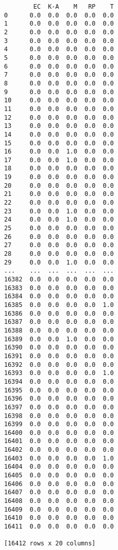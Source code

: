 \documentclass[11pt]{article}
\begin{document}
\begin{verbatim}
        EC  K-A    M   RP    T  
0      0.0  0.0  0.0  0.0  0.0  
1      0.0  0.0  0.0  0.0  0.0  
2      0.0  0.0  0.0  0.0  0.0  
3      0.0  0.0  0.0  0.0  0.0  
4      0.0  0.0  0.0  0.0  0.0  
5      0.0  0.0  0.0  0.0  0.0  
6      0.0  0.0  0.0  0.0  0.0  
7      0.0  0.0  0.0  0.0  0.0  
8      0.0  0.0  0.0  0.0  0.0  
9      0.0  0.0  0.0  0.0  0.0  
10     0.0  0.0  0.0  0.0  0.0  
11     0.0  0.0  0.0  0.0  0.0  
12     0.0  0.0  0.0  0.0  0.0  
13     0.0  0.0  0.0  0.0  0.0  
14     0.0  0.0  0.0  0.0  0.0  
15     0.0  0.0  0.0  0.0  0.0  
16     0.0  0.0  1.0  0.0  0.0  
17     0.0  0.0  1.0  0.0  0.0  
18     0.0  0.0  0.0  0.0  0.0  
19     0.0  0.0  0.0  0.0  0.0  
20     0.0  0.0  0.0  0.0  0.0  
21     0.0  0.0  0.0  0.0  0.0  
22     0.0  0.0  0.0  0.0  0.0  
23     0.0  0.0  1.0  0.0  0.0  
24     0.0  0.0  1.0  0.0  0.0  
25     0.0  0.0  0.0  0.0  0.0  
26     0.0  0.0  0.0  0.0  0.0  
27     0.0  0.0  0.0  0.0  0.0  
28     0.0  0.0  0.0  0.0  0.0  
29     0.0  0.0  1.0  0.0  0.0  
...    ...  ...  ...  ...  ...  
16382  0.0  0.0  0.0  0.0  0.0  
16383  0.0  0.0  0.0  0.0  0.0  
16384  0.0  0.0  0.0  0.0  0.0  
16385  0.0  0.0  0.0  0.0  1.0  
16386  0.0  0.0  0.0  0.0  0.0  
16387  0.0  0.0  0.0  0.0  0.0  
16388  0.0  0.0  0.0  0.0  0.0  
16389  0.0  0.0  1.0  0.0  0.0  
16390  0.0  0.0  0.0  0.0  0.0  
16391  0.0  0.0  0.0  0.0  0.0  
16392  0.0  0.0  0.0  0.0  0.0  
16393  0.0  0.0  0.0  0.0  1.0  
16394  0.0  0.0  0.0  0.0  0.0  
16395  0.0  0.0  0.0  0.0  0.0  
16396  0.0  0.0  0.0  0.0  0.0  
16397  0.0  0.0  0.0  0.0  0.0  
16398  0.0  0.0  0.0  0.0  0.0  
16399  0.0  0.0  0.0  0.0  0.0  
16400  0.0  0.0  0.0  0.0  0.0  
16401  0.0  0.0  0.0  0.0  0.0  
16402  0.0  0.0  0.0  0.0  0.0  
16403  0.0  0.0  0.0  0.0  1.0  
16404  0.0  0.0  0.0  0.0  0.0  
16405  0.0  0.0  0.0  0.0  0.0  
16406  0.0  0.0  0.0  0.0  0.0  
16407  0.0  0.0  0.0  0.0  0.0  
16408  0.0  0.0  0.0  0.0  0.0  
16409  0.0  0.0  0.0  0.0  0.0  
16410  0.0  0.0  0.0  0.0  0.0  
16411  0.0  0.0  0.0  0.0  0.0  

[16412 rows x 20 columns]
    \end{verbatim}
\end{document}
